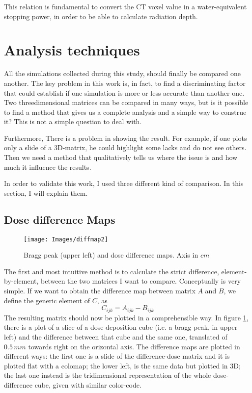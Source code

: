 \documentclass[12pt, a4paper, twoside]{book}
\begin{document}
This relation is fundamental to convert the CT voxel value in a water-equivalent stopping power, in order to be able to calculate radiation depth.


\section{Analysis techniques}
All the simulations collected during this study, should finally be compared one another. 
The key problem in this work is, in fact, to find a discriminating factor that could establish if one simulation is more or less accurate than another one. Two threedimensional matrices can be compared in many ways, but is it possible to find a method that gives us a complete analysis and a simple way to construe it?
This is not a simple question to deal with. 

Furthermore, There is a problem in showing the result. For example, if one plots only a slide of a 3D-matrix, he could highlight some lacks and do not see others. Then we need a method that qualitatively tells us where the issue is and how much it influence the results.

In order to validate this work, I used three different kind of comparison. In this section, I will explain them.

\subsection{Dose difference Maps}
\begin{figure}[t!]
\texttt{[image: Images/diffmap2]}
\caption{Bragg peak (upper left) and dose difference maps. Axis in $cm$}
\label{fig:diff}
\end{figure}
The first and most intuitive method is to calculate the strict difference, element-by-element, between the two matrices I want to compare. Conceptually is very simple. If we want to obtain the difference map between matrix $A$ and $B$, we define the generic element of $C$, as
\[
C_{ijk} = A_{ijk} - B_{ijk}
\]
The resulting matrix should now be plotted in a comprehensible way. In figure \ref{fig:diff}, there is a plot of a slice of a dose deposition cube (i.e. a bragg peak, in upper left) and the difference between that cube and the same one, translated of $0.5\,mm$ towards right on the orizontal axis. 
The difference maps are plotted in different ways: the first one is a slide of the difference-dose matrix and it is plotted flat with a colomap; the lower left, is the same data but plotted in 3D; the last one instead is the tridimensional representation of the whole dose-difference cube, given with similar color-code.
\end{document}
